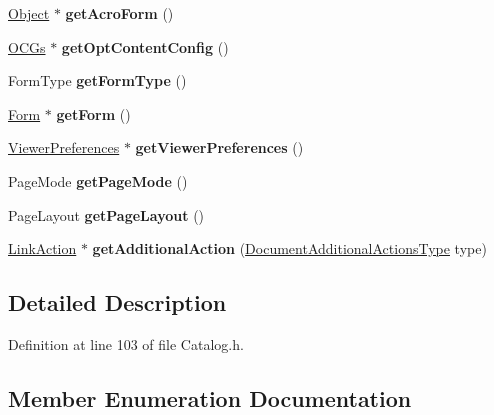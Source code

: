 \begin{DoxyCompactItemize}
\hyperlink{class_object}{Object} $\ast$ {\bfseries get\+Acro\+Form} ()
\item 
\mbox{\label{class_catalog_a9a6735468ae34db4787f0547029752b9}} 
\hyperlink{class_o_c_gs}{O\+C\+Gs} $\ast$ {\bfseries get\+Opt\+Content\+Config} ()
\item 
\mbox{\label{class_catalog_a78b8c32e53bf951d050bb884043af433}} 
Form\+Type {\bfseries get\+Form\+Type} ()
\item 
\mbox{\label{class_catalog_a02e95fb2949bc74ef15543f3d8ab53c2}} 
\hyperlink{class_form}{Form} $\ast$ {\bfseries get\+Form} ()
\item 
\mbox{\label{class_catalog_ae527535d3ad76a21e79d1dc0ce3b376b}} 
\hyperlink{class_viewer_preferences}{Viewer\+Preferences} $\ast$ {\bfseries get\+Viewer\+Preferences} ()
\item 
\mbox{\label{class_catalog_abde2ef48daa9e21efcfb7222f4cec9bc}} 
Page\+Mode {\bfseries get\+Page\+Mode} ()
\item 
\mbox{\label{class_catalog_ad70bb9db5c1bbf5e8feade7a17f04842}} 
Page\+Layout {\bfseries get\+Page\+Layout} ()
\item 
\mbox{\label{class_catalog_a62ff5ba736455a2824cb7c4a2ea6f91f}} 
\hyperlink{class_link_action}{Link\+Action} $\ast$ {\bfseries get\+Additional\+Action} (\hyperlink{class_catalog_acd1ae95dd8f85f0dae630c8904dcfb6e}{Document\+Additional\+Actions\+Type} type)
\end{DoxyCompactItemize}


\subsection{Detailed Description}


Definition at line 103 of file Catalog.\+h.



\subsection{Member Enumeration Documentation}
\mbox{\label{class_catalog_acd1ae95dd8f85f0dae630c8904dcfb6e}} 
